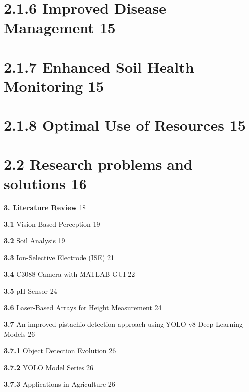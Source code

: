 \documentclass{book} %
\begin{document}
\chapter{2.1.6 Improved Disease Management              15}


\chapter{2.1.7 Enhanced Soil Health Monitoring             15}


\chapter{2.1.8 Optimal Use of Resources              15}

\noindent 
\chapter{2.2 Research problems and solutions                          16}

\noindent \textbf{3. Literature Review                                                                                                                  }18

\textbf{ 3.1 }Vision-Based Perception                                                                                              19

\noindent 

\noindent 

\textbf{ 3.2 }Soil Analysis                                                                                                                19

\textbf{ 3.3 }Ion-Selective Electrode (ISE)               21

\textbf{ 3.4 }C3088 Camera with MATLAB GUI                         22

\textbf{ 3.5 }pH Sensor                             24

\textbf{ 3.6 }Laser-Based Arrays for Height Measurement             24

\textbf{ 3.7 }An improved pistachio detection approach using YOLO-v8 Deep Learning Models 26

\textbf{  3.7.1 }Object Detection Evolution              26

\textbf{  3.7.2 }YOLO Model Series                                     26

\textbf{  3.7.3 }Applications in Agriculture                                           26
\end{document}
